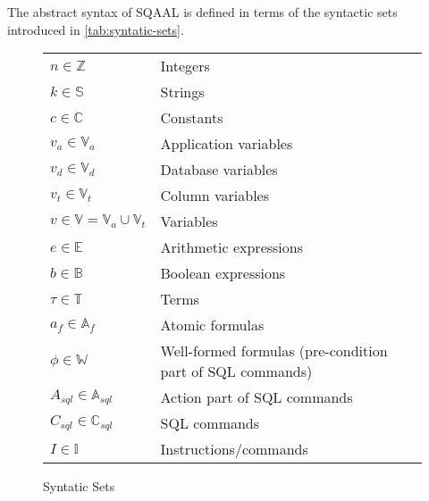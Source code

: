 The abstract syntax of SQAAL is defined in terms of the syntactic sets introduced in \autoref{tab:syntatic-sets}.
\begin{figure}[htb!]
     \center
    \begin{tabular}{l l}
    $n \in \mathbb{Z}$                          & Integers                                                   \\
    $k \in \mathbb{S}$                                  & Strings                                                    \\
    $c \in \mathbb{C}$                          & Constants                                                 \\
    $v_a \in \mathbb{V}_a$                      & Application variables                                     \\
    $v_d \in \mathbb{V}_d$                      & Database variables \\
    $v_t \in \mathbb{V}_t$                    & Column variables   \\
    $v \in \mathbb{V} = \mathbb{V}_a \cup \mathbb{V}_t$ & Variables                                                 \\
    $e \in \mathbb{E}$                          & Arithmetic expressions                                    \\
    $b \in \mathbb{B}$                          & Boolean expressions                                       \\
    $\tau \in \mathbb{T}$                       & Terms                                                     \\
    $a_f \in \mathbb{A}_f$                      & Atomic formulas                                           \\
    $\phi  \in \mathbb{W}$                      & Well-formed formulas (pre-condition part of SQL commands) \\
    $A_{sql} \in \mathbb{A}_{sql}$              & Action part of SQL commands                               \\
    $C_{sql} \in \mathbb{C}_{sql}$              & SQL commands                                              \\
    $I \in \mathbb{I}$                          & Instructions/commands                                     \\
    \end{tabular}
    \caption{Syntatic Sets}
    \label{tab:syntatic-sets}
\end{figure}

